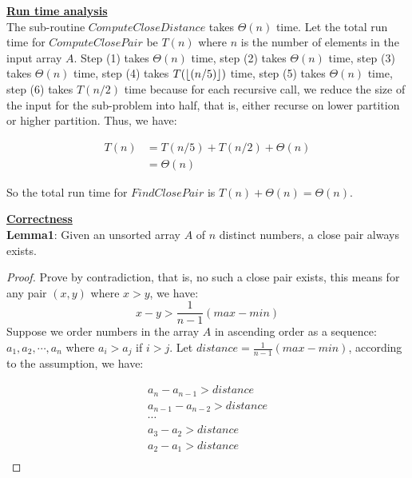 \documentclass[11pt]{article}
\DeclarePairedDelimiter\floor{\lfloor}{\rfloor}
\begin{document}
\begin{enumerate}
  \underline{\textbf{Run time analysis}}\\
  The sub-routine $ComputeCloseDistance$ takes $\Theta(n)$ time. 
  Let the total run time for $ComputeClosePair$ be $T(n)$ where $n$ is
  the number of elements in the input array $A$.
  Step (1) takes $\Theta(n)$ time, step (2) takes
  $\Theta(n)$ time, step (3) takes $\Theta(n)$ time, step (4) takes
  $T(\floor{(n/5)})$ time, step (5) takes $\Theta(n)$ time, step (6)
  takes $T(n/2)$ time because for each recursive call, we reduce the
  size of the input for the sub-problem into half, that is, either
  recurse on lower partition or higher partition. Thus, we have:

  \begin{equation}
    \begin{split}
      T(n) &= T(n/5) + T(n/2) + \Theta(n) \\
      & = \Theta(n)
    \end{split}
  \end{equation}

  So the total run time for $FindClosePair$ is $T(n) + \Theta(n) =
  \Theta(n)$. 

  \underline{\textbf{Correctness}}\\
  \textbf{Lemma1}: Given an unsorted array $A$ of $n$ distinct numbers, a
  close pair always exists.

  \begin{proof}
    Prove by contradiction, that is, no such a close pair exists, this
    means for any pair $(x,y)$ where $x > y$, we have:
    \begin{equation}
      x - y > \frac{1}{n-1} (max - min)
    \end{equation}
    Suppose we order numbers in the array $A$ in ascending order as a
    sequence: $a_1, a_2, \cdots, a_n$ where $a_i > a_j$ if $i >
    j$. Let $distance = \frac{1}{n-1} (max - min)$, according to the
    assumption, we have:

    \begin{equation}
      \begin{split}
      a_n - a_{n-1} > distance\\
      a_{n-1} - a_{n-2} > distance\\
      \cdots\\
      a_3 - a_2 > distance\\
      a_2 - a_1 > distance\\
      \end{split}
    \end{equation}


\end{proof}
\end{enumerate}
\end{document}
